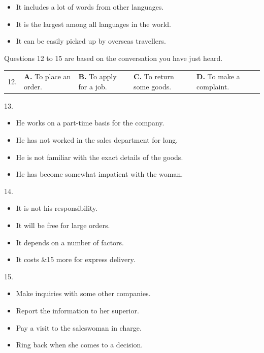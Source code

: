 \documentclass[UTF8,11pt]{ctexart}
\begin{document}
\begin{itemize}[leftmargin=2em,itemsep=.2em,topsep=.4em]\item[B.] It includes a lot of words from other languages.
\item[C.] It is the largest among all languages in the world.
\item[D.] It can be easily picked up by overseas travellers.
\end{itemize}

Questions 12 to 15 are based on the conversation you have just heard.


\noindent\begin{tabularx}{\linewidth}{@{}lXXXX@{}}12. & \textbf{A.} To place an order. & \textbf{B.} To apply for a job. & \textbf{C.} To return some goods. & \textbf{D.} To make a complaint.\\\end{tabularx}\par

13.


\begin{itemize}[leftmargin=2em,itemsep=.2em,topsep=.4em]\item[A.] He works on a part-time basis for the company.
\item[B.] He has not worked in the sales department for long.
\item[C.] He is not familiar with the exact details of the goods.
\item[D.] He has become somewhat impatient with the woman.
\end{itemize}

14.


\begin{itemize}[leftmargin=2em,itemsep=.2em,topsep=.4em]\item[A.] It is not his responsibility.
\item[B.] It will be free for large orders.
\item[C.] It depends on a number of factors.
\item[D.] It costs \&15 more for express delivery.
\end{itemize}

15.


\begin{itemize}[leftmargin=2em,itemsep=.2em,topsep=.4em]\item[A.] Make inquiries with some other companies.
\item[B.] Report the information to her superior.
\item[C.] Pay a visit to the saleswoman in charge.
\item[D.] Ring back when she comes to a decision.
\end{itemize}
\end{document}
